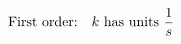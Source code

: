 \documentclass[preview]{standalone}
\begin{document}
\begin{align*}
\special{dvisvgm:raw <g id='unique000'>}\text{First order:} \quad k \text{ has units } \frac{1}{s}\special{dvisvgm:raw </g>}
\end{align*}
\end{document}
